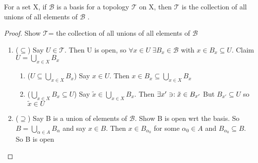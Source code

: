 \documentclass[11pt]{amsart}
\begin{document}
\begin{lemma}
For a set X, if $\mathcal{B}$ is a basis for a topology $\mathcal{T}$ on X, then  $\mathcal{T}$ is the collection of all unions of all elements of $\mathcal{B}$ .
\begin{proof} Show $\mathcal{T}$= the collection of all unions of all elements of $\mathcal{B}$
\begin{enumerate}
\item ($\subseteq$) Say $U \in \mathcal{T}$. Then U is open, so $\forall x \in U \; \exists B_x \in \mathcal{B}$ with $x \in B_x \subseteq U$. 
Claim $U = \bigcup\limits_{x \in X} B_x$
\begin{enumerate}
\item ($U \subseteq  \bigcup\limits_{x \in X} B_x$) Say $x \in U$. Then $x \in B_x \subseteq \bigcup\limits_{x \in X} B_x$
\item ($ \bigcup\limits_{x \in X} B_x \subseteq U$) Say $\tilde{x} \in \bigcup\limits_{x \in X} B_x$. Then $\exists x' \ni : \tilde{x} \in B_{x'}$ But $B_{x'} \subseteq U$ so $\tilde{x} \in U$
\end{enumerate}
\item  ($\supseteq$) Say B is a union of elements of  $\mathcal{B}$. Show B is open wrt the basis. So $B = \bigcup\limits_{\alpha \in A} B_{\alpha}$ and say $x \in B$. Then $x \in B_{\alpha_0}$ for some $\alpha_0 \in A$ and $B_{\alpha_0} \subseteq B$. So B is open
\end{enumerate}
\end{proof}
\end{lemma}
\end{document}

